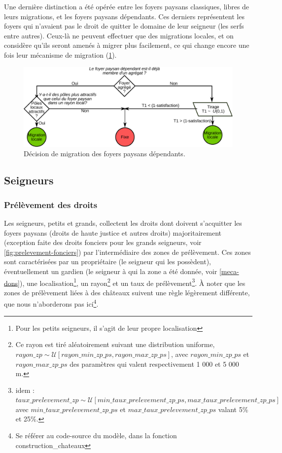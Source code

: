 Une dernière distinction a été opérée entre les foyers paysans classiques, libres de leurs migrations, et les foyers paysans \og dépendants\fg{}.
Ces derniers représentent les foyers qui n'avaient pas le droit de quitter le domaine de leur seigneur (les serfs entre autres).
Ceux-là ne peuvent effectuer que des migrations locales, et on considère qu'ils seront amenés à migrer plus facilement, ce qui change encore une fois leur mécanisme de migration (\cref{fig:choix-migration-dependants}).
\begin{figure}[H]
	\centering
	\includegraphics[width=0.9\linewidth]{img/choix_migration_dependants.pdf}
	\caption{Décision de migration des foyers paysans dépendants.}
	\label{fig:choix-migration-dependants}
\end{figure}
 

	
\subsection{Seigneurs}
	\subsubsection{Prélèvement des droits \label{sssec:collecte-droits}}
\setcounter{footnote}{\value{savefootnote}}
Les seigneurs, petits et grands, collectent les droits dont doivent s'acquitter les foyers paysans (droits de haute justice et autres droits) majoritairement (exception faite des droits fonciers pour les grands seigneurs, voir \cref{fig:prelevement-fonciers}) par l'intermédiaire des zones de prélèvement.
Ces zones sont caractérisées par un propriétaire (le seigneur qui les possèdent), éventuellement un gardien (le seigneur à qui la zone a été \og donnée\fg{}, voir \cref{meca-dons}), une localisation\footnote{Pour les petits seigneurs, il s'agit de leur propre localisation}, un rayon\footnote{
Ce rayon est tiré aléatoirement suivant une distribution uniforme, \\$rayon\_zp \sim \mathcal{U}\left[ rayon\_min\_zp\_ps , rayon\_max\_zp\_ps \right]$, avec $rayon\_min\_zp\_ps$ et $rayon\_max\_zp\_ps$ des paramètres qui valent respectivement 1 000 et 5 000 m.
} et un taux de prélèvement\footnote{
idem : $taux\_prelevement\_zp \sim \mathcal{U}\left[ min\_taux\_prelevement\_zp\_ps , max\_taux\_prelevement\_zp\_ps \right]$ avec $min\_taux\_prelevement\_zp\_ps$ et $max\_taux\_prelevement\_zp\_ps$ valant 5\% et 25\%.
}.
À noter que les zones de prélèvement liées à des châteaux suivent une règle légèrement différente, que nous n'aborderons pas ici\footnote{Se référer au code-source du modèle, dans la fonction \textsf{construction\_chateaux}}.

